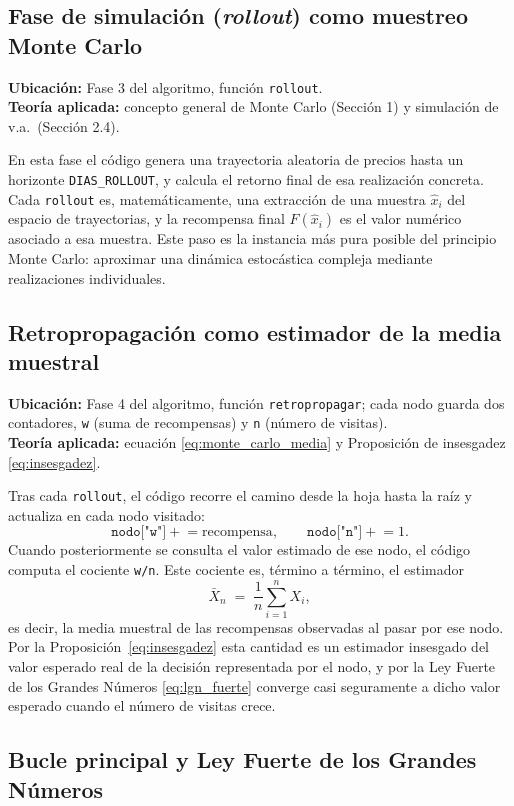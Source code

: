 \documentclass[11pt,a4paper]{article}
\theoremstyle{definition}
\begin{document}
\subsection{Fase de simulación (\emph{rollout}) como muestreo Monte Carlo}

\textbf{Ubicación:} Fase 3 del algoritmo, función \texttt{rollout}.\\
\textbf{Teoría aplicada:} concepto general de Monte Carlo (Sección 1) y simulación de v.a.\ (Sección 2.4).

En esta fase el código genera una trayectoria aleatoria de precios hasta un horizonte \texttt{DIAS\_ROLLOUT}, y calcula el retorno final de esa realización concreta. Cada \texttt{rollout} es, matemáticamente, una extracción de una muestra $\hat{x}_i$ del espacio de trayectorias, y la recompensa final $F(\hat{x}_i)$ es el valor numérico asociado a esa muestra. Este paso es la instancia más pura posible del principio Monte Carlo: aproximar una dinámica estocástica compleja mediante realizaciones individuales.

\subsection{Retropropagación como estimador de la media muestral}

\textbf{Ubicación:} Fase 4 del algoritmo, función \texttt{retropropagar}; cada nodo guarda dos contadores, \texttt{w} (suma de recompensas) y \texttt{n} (número de visitas).\\
\textbf{Teoría aplicada:} ecuación \eqref{eq:monte_carlo_media} y Proposición de insesgadez \eqref{eq:insesgadez}.

Tras cada \texttt{rollout}, el código recorre el camino desde la hoja hasta la raíz y actualiza en cada nodo visitado:
\[
\texttt{nodo["w"]}\mathrel{+}=\text{recompensa}, \qquad \texttt{nodo["n"]}\mathrel{+}=1.
\]
Cuando posteriormente se consulta el valor estimado de ese nodo, el código computa el cociente \texttt{w/n}. Este cociente es, término a término, el estimador
\[
\bar{X}_n \;=\; \frac{1}{n}\sum_{i=1}^{n} X_i,
\]
es decir, la media muestral de las recompensas observadas al pasar por ese nodo. Por la Proposición~\ref{eq:insesgadez} esta cantidad es un estimador insesgado del valor esperado real de la decisión representada por el nodo, y por la Ley Fuerte de los Grandes Números \eqref{eq:lgn_fuerte} converge casi seguramente a dicho valor esperado cuando el número de visitas crece.

\subsection{Bucle principal y Ley Fuerte de los Grandes Números}
\end{document}
